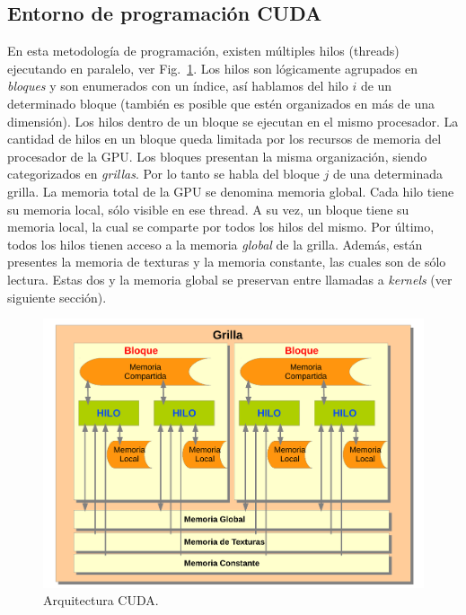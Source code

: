 \subsection{Entorno de programación CUDA}
En esta metodolog\'ia de programaci\'on, existen m\'ultiples hilos (threads) ejecutando en paralelo, ver Fig.~\ref{fg:cuda}.
Los hilos son l\'ogicamente agrupados en {\em bloques} y son enumerados con un \'indice, as\'i hablamos del hilo $i$ de un determinado bloque (también es posible que estén organizados en más de una dimensión).
Los hilos dentro de un bloque se ejecutan en el mismo procesador.
La cantidad de hilos en un bloque queda limitada por los recursos de memoria del procesador de la GPU. Los bloques presentan la misma organizaci\'on, siendo categorizados en {\em grillas}. 
Por lo tanto se habla del bloque $j$ de una determinada grilla.
La memoria total de la GPU se denomina memoria global. Cada hilo tiene su memoria local, s\'olo visible en ese thread.
A su vez, un bloque tiene su memoria local, la cual se comparte por todos los hilos del mismo.
Por \'ultimo, todos los hilos tienen acceso a la memoria {\em global} de la grilla.
Adem\'as, est\'an presentes la memoria de texturas y la memoria constante, las cuales son de s\'olo lectura.
Estas dos y la memoria global se preservan entre llamadas a {\em kernels} (ver siguiente secci\'on).

\begin{figure}[h]
\begin{center}
\includegraphics[width=13cm]{figures/cuda}
\end{center}
\caption{Arquitectura CUDA.}
\label{fg:cuda}
\end{figure}


